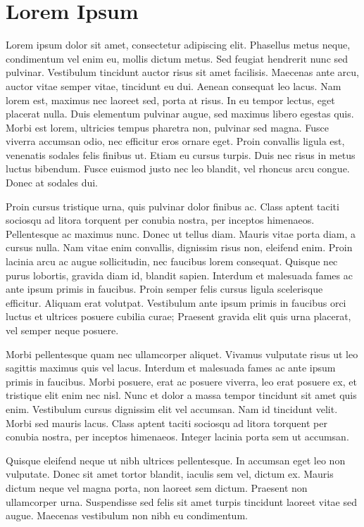 \section{Lorem Ipsum}
Lorem ipsum dolor sit amet, consectetur adipiscing elit. Phasellus metus neque, condimentum vel enim eu, mollis dictum metus. Sed feugiat hendrerit nunc sed pulvinar. Vestibulum tincidunt auctor risus sit amet facilisis. Maecenas ante arcu, auctor vitae semper vitae, tincidunt eu dui. Aenean consequat leo lacus. Nam lorem est, maximus nec laoreet sed, porta at risus. In eu tempor lectus, eget placerat nulla. Duis elementum pulvinar augue, sed maximus libero egestas quis. Morbi est lorem, ultricies tempus pharetra non, pulvinar sed magna. Fusce viverra accumsan odio, nec efficitur eros ornare eget. Proin convallis ligula est, venenatis sodales felis finibus ut. Etiam eu cursus turpis. Duis nec risus in metus luctus bibendum. Fusce euismod justo nec leo blandit, vel rhoncus arcu congue. Donec at sodales dui.

Proin cursus tristique urna, quis pulvinar dolor finibus ac. Class aptent taciti sociosqu ad litora torquent per conubia nostra, per inceptos himenaeos. Pellentesque ac maximus nunc. Donec ut tellus diam. Mauris vitae porta diam, a cursus nulla. Nam vitae enim convallis, dignissim risus non, eleifend enim. Proin lacinia arcu ac augue sollicitudin, nec faucibus lorem consequat. Quisque nec purus lobortis, gravida diam id, blandit sapien. Interdum et malesuada fames ac ante ipsum primis in faucibus. Proin semper felis cursus ligula scelerisque efficitur. Aliquam erat volutpat. Vestibulum ante ipsum primis in faucibus orci luctus et ultrices posuere cubilia curae; Praesent gravida elit quis urna placerat, vel semper neque posuere.

Morbi pellentesque quam nec ullamcorper aliquet. Vivamus vulputate risus ut leo sagittis maximus quis vel lacus. Interdum et malesuada fames ac ante ipsum primis in faucibus. Morbi posuere, erat ac posuere viverra, leo erat posuere ex, et tristique elit enim nec nisl. Nunc et dolor a massa tempor tincidunt sit amet quis enim. Vestibulum cursus dignissim elit vel accumsan. Nam id tincidunt velit. Morbi sed mauris lacus. Class aptent taciti sociosqu ad litora torquent per conubia nostra, per inceptos himenaeos. Integer lacinia porta sem ut accumsan.

Quisque eleifend neque ut nibh ultrices pellentesque. In accumsan eget leo non vulputate. Donec sit amet tortor blandit, iaculis sem vel, dictum ex. Mauris dictum neque vel magna porta, non laoreet sem dictum. Praesent non ullamcorper urna. Suspendisse sed felis sit amet turpis tincidunt laoreet vitae sed augue. Maecenas vestibulum non nibh eu condimentum.

